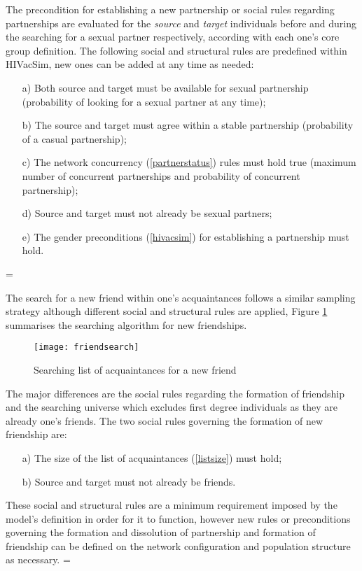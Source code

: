 The precondition for establishing a new partnership or social rules regarding
partnerships are evaluated for the \emph{source} and \emph{target} individuals before and
during the searching for a sexual partner respectively, according with each one's core
group definition. The following social and structural rules are predefined within
HIVacSim, new ones can be added at any time as needed:
\parskip=0pt
\begin{itemize}
    \item [a)] Both source and target must be available for sexual partnership (probability
    of looking for a sexual partner at any time);
    \item [b)] The source and target must agree within a stable partnership (probability
    of a casual partnership);
    \item [c)] The network concurrency (\ref{partnerstatus}) rules must hold true (maximum
    number of concurrent partnerships and probability of concurrent partnership);
    \item [d)] Source and target must not already be sexual partners;
    \item [e)] The gender preconditions (\ref{hivacsim}) for establishing a partnership must hold.
\end{itemize}
\parskip=\baselineskip

The search for a new friend within one's acquaintances follows a similar sampling
strategy although different social and structural rules are applied, Figure
\ref{friendsearch} summarises the searching algorithm for new friendships.
\begin{figure}[h]
\begin{center}
\texttt{[image: friendsearch]}
\caption{Searching list of acquaintances for a new friend} \label{friendsearch}
\end{center}
\end{figure}

The major differences are the social rules regarding the formation of friendship and the
searching universe which excludes first degree individuals as they are already one's
friends. The two social rules governing the formation of new friendship are:
\parskip=0pt
\begin{itemize}
    \item [a)] The size of the list of acquaintances (\ref{listsize}) must hold;
    \item [b)] Source and target must not already be friends.
\end{itemize}
These social and structural rules are a minimum requirement imposed by the model's
definition in order for it to function, however new rules or preconditions governing the
formation and dissolution of partnership and formation of friendship can be defined on
the network configuration and population structure as necessary.
\parskip=\baselineskip

